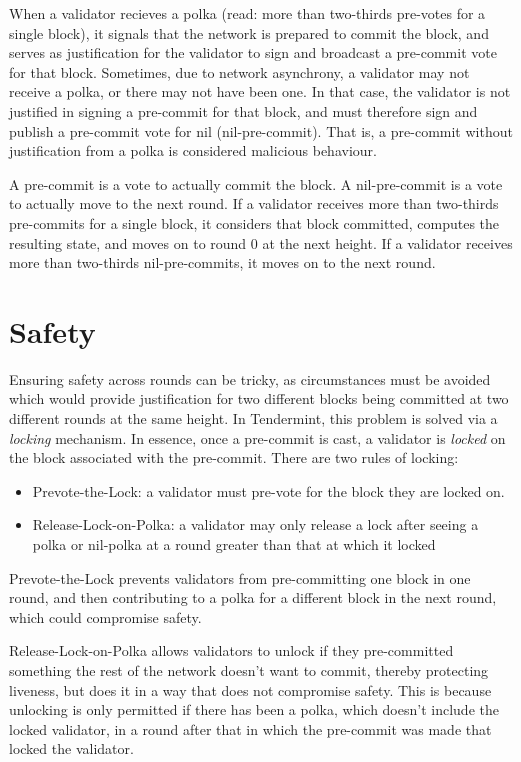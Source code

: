 When a validator recieves a polka (read: more than two-thirds pre-votes for a single block), 
it signals that the network is prepared to commit the block,
and serves as justification for the validator to sign and broadcast a pre-commit vote for that block.
Sometimes, due to network asynchrony, a validator may not receive a polka, or there may not have been one. 
In that case, the validator is not justified in signing a pre-commit for that block, 
and must therefore sign and publish a pre-commit vote for nil (nil-pre-commit).
That is, a pre-commit without justification from a polka is considered malicious behaviour.

A pre-commit is a vote to actually commit the block.
A nil-pre-commit is a vote to actually move to the next round.
If a validator receives more than two-thirds pre-commits for a single block, 
it considers that block committed, computes the resulting state,
and moves on to round 0 at the next height.
If a validator receives more than two-thirds nil-pre-commits,
it moves on to the next round.

\section{Safety}

Ensuring safety across rounds can be tricky, 
as circumstances must be avoided which would provide justification for two different blocks being committed at two different rounds at the same height.
In Tendermint, this problem is solved via a \emph{locking} mechanism.
In essence, once a pre-commit is cast, a validator is \emph{locked} on the block associated with the pre-commit.
There are two rules of locking:

\begin{itemize}
\item{Prevote-the-Lock: a validator must pre-vote for the block they are locked on.}
\item{Release-Lock-on-Polka: a validator may only release a lock after seeing a polka or nil-polka at a round greater than that at which it locked}
\end{itemize}

Prevote-the-Lock prevents validators from pre-committing one block in one round, 
and then contributing to a polka for a different block in the next round, 
which could compromise safety.

Release-Lock-on-Polka allows validators to unlock if they pre-committed something the rest of the network doesn't want to commit,
thereby protecting liveness, but does it in a way that does not compromise safety.
This is because unlocking is only permitted if there has been a polka, which doesn't include the locked validator,
in a round after that in which the pre-commit was made that locked the validator.

